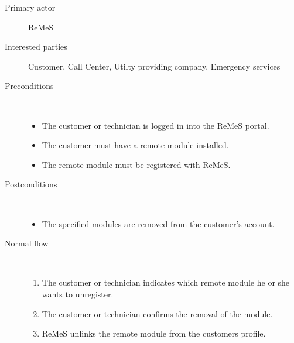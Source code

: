 \begin{description}
	\item[Primary actor] ReMeS
	\item[Interested parties] Customer, Call Center, Utilty providing company,
	Emergency services
	\item[Preconditions] \ 
	\begin{itemize}
		\item The customer or technician is logged in into the ReMeS portal. 
		\item The customer must have a remote module installed.
		\item The remote module must be registered with ReMeS.
	\end{itemize}
	\item[Postconditions] \ 
	\begin{itemize}
		\item The specified modules are removed from the customer's account.
	\end{itemize}
	\item[Normal flow] \ 
	\begin{enumerate}
	  	\item The customer or technician indicates which remote module he or she
	  	wants to unregister.
	  	\item The customer or technician confirms the removal of the module.
	  	\item ReMeS unlinks the remote module from the customers profile. 
	\end{enumerate}
\end{description}